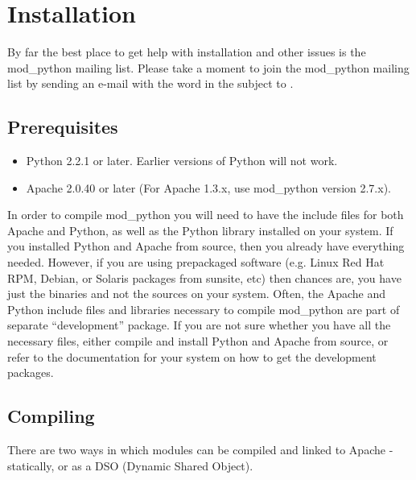 \chapter{Installation\label{installation}}

\begin{notice}
  By far the best place to get help with installation and other issues
  is the mod_python mailing list. Please take a moment to join the
  mod_python mailing list by sending an e-mail with the word
   in the subject to
  .
\end{notice}

\section{Prerequisites\label{inst-prerequisites}}

\begin{itemize}
\item
  Python 2.2.1 or later. Earlier versions of Python will not work.
\item
  Apache 2.0.40 or later (For Apache 1.3.x, use mod_python version 2.7.x).
\end{itemize}

In order to compile mod_python you will need to have the include files
for both Apache and Python, as well as the Python library installed on
your system.  If you installed Python and Apache from source, then you
already have everything needed. However, if you are using prepackaged
software (e.g. Linux Red Hat RPM, Debian, or Solaris packages from
sunsite, etc) then chances are, you have just the binaries and not the
sources on your system. Often, the Apache and Python include files and
libraries necessary to compile mod_python are part of separate
``development'' package. If you are not sure whether you have all the
necessary files, either compile and install Python and Apache from
source, or refer to the documentation for your system on how to get
the development packages.

\section{Compiling\label{inst-compiling}}

There are two ways in which modules can be compiled and linked to
Apache - statically, or as a DSO (Dynamic Shared Object).

